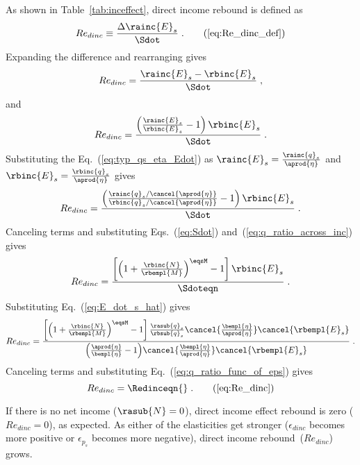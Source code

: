 As shown in Table~\ref{tab:inceffect}, direct income rebound is defined as
%
\begin{equation}
  Re_{dinc} \equiv \frac{\Delta \rainc{E}_s}{\Sdot} \; . \tag{\ref{eq:Re_dinc_def}}
\end{equation}
%
Expanding the difference and rearranging gives
%
\begin{equation}
  Re_{dinc} = \frac{\rainc{E}_s - \rbinc{E}_s}{\Sdot} \; , 
\end{equation}
%
and
%
\begin{equation}
  Re_{dinc} = \frac{\left( \frac{\rainc{E}_s}{\rbinc{E}_s} - 1  \right) \rbinc{E}_s}{\Sdot} \; .
\end{equation}
%
Substituting the Eq.~(\ref{eq:typ_qs_eta_Edot}) as
$\rainc{E}_s = \frac{\rainc{q}_s}{\aprod{\eta}}$ and  
$\rbinc{E}_s = \frac{\rbinc{q}_s}{\aprod{\eta}}$ gives
%
\begin{equation}
  Re_{dinc} = \frac{\left( \frac{\rainc{q}_s / \cancel{\aprod{\eta}}}{\rbinc{q}_s / \cancel{\aprod{\eta}}} - 1  \right) \rbinc{E}_s} 
              {\Sdot} \; .
\end{equation}
%
Canceling terms and substituting Eqs.~(\ref{eq:Sdot}) and~(\ref{eq:q_ratio_across_inc}) gives
%
\begin{equation}
  Re_{dinc} = \frac{\left[ \left( 1 + \frac{\rbinc{N}}{\rbempl{M}} \right) ^{\eqsM} - 1  \right] \rbinc{E}_s} 
              {\Sdoteqn} \; .
\end{equation}
%
Substituting Eq.~(\ref{eq:E_dot_s_hat}) gives
%
\begin{equation}
  Re_{dinc} = \frac{\left[ \left( 1 + \frac{\rbinc{N}}{\rbempl{M}} \right) ^{\eqsM} - 1  \right] 
                  \frac{\rasub{q}_s}{\rbsub{q}_s}
                \cancel{\frac{\bempl{\eta}}{\aprod{\eta}}}
                \cancel{\rbempl{E}_s}}
              {\left( \frac{\aprod{\eta}}{\bempl{\eta}} - 1 \right)\! \cancel{\frac{\bempl{\eta}}{\aprod{\eta}}} \cancel{\rbempl{E}_s}} \; .
\end{equation}
%
Canceling terms and substituting Eq.~(\ref{eq:q_ratio_func_of_eps}) gives
%
\begin{equation} 
  Re_{dinc} = \Redinceqn{} \; . \tag{\ref{eq:Re_dinc}}
\end{equation}

If there is no net income ($\rasub{N} = 0$), 
direct income effect rebound is zero ($Re_{dinc} = 0$), as expected.
As either of the elasticities get stronger 
($\epsilon_{dinc}$ becomes more positive or $\epsilon_{p_s}$ becomes more negative), 
direct income rebound~($Re_{dinc}$) grows.

